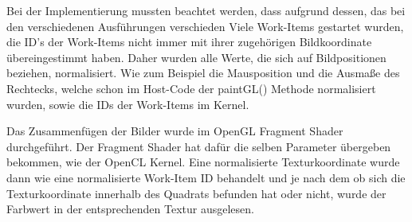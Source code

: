 Bei der Implementierung mussten beachtet werden, dass aufgrund dessen, das bei den verschiedenen Ausführungen verschieden Viele Work-Items gestartet wurden, die ID's der Work-Items nicht immer mit ihrer zugehörigen Bildkoordinate übereingestimmt haben.
Daher wurden alle Werte, die sich auf Bildpositionen beziehen, normalisiert.
Wie zum Beispiel die Mausposition und die Ausmaße des Rechtecks, welche schon im Host-Code der paintGL() Methode normalisiert wurden, sowie die IDs der Work-Items im Kernel.

Das Zusammenfügen der Bilder wurde im OpenGL Fragment Shader durchgeführt.
Der Fragment Shader hat dafür die selben Parameter übergeben bekommen, wie der OpenCL Kernel.
Eine normalisierte Texturkoordinate wurde dann wie eine normalisierte Work-Item ID behandelt und je nach dem ob sich die Texturkoordinate innerhalb des Quadrats befunden hat oder nicht, wurde der Farbwert in der entsprechenden Textur ausgelesen.

